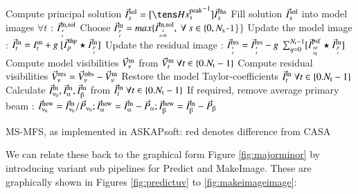 \documentclass[11pt,a4paper]{article}
\begin{document}
\begin{algorithm}
{{{{          Compute principal solution $\I^{\rm sol}_s = [{\He^{\rm peak}_s}^{-1}] \I^{\rm rhs}_s$\;
          Fill solution ${\vec{I}}^{\rm sol}_s$ into model images $\forall t$ : ${\vec{I}}^{\rm m,sol}_{{s}\atop{t}}$
       }
     }
     Choose ${\vec{I}}^{\rm m}_{{p}\atop{t}} = max\{{\vec{I}}^{\rm m,sol}_{{s}\atop{t=0}},~\forall~s\in\{0,N_{\rm s} $-$1\}\}$ \;
       {
        Update the model image : ${\vec{I}}^{\rm m}_t = I^{\rm m}_t + g ~[ {\vec{I}}^{\rm shp}_{p} \star {\vec{I}}^{\rm m}_{{p}\atop{t}}]$ \;
	{
          Update the residual image : ${\vec{I}}^{\rm res}_{{s}\atop{t}} = {\vec{I}}^{\rm res}_{{s}\atop{t}} - g ~\sum_{q=0}^{N_{\rm t} -1}[{\vec{I}}^{\rm psf}_{{sp}\atop{tq}} \star {\vec{I}}^{\rm m}_{{p}\atop{t}}]$\;
	}
       }
    }
   {\color{red} Compute model visibilities $\vec{V}^{\rm m}_{\nu}$ from  $\vec{V}^{\rm m}_t~\forall t\in \{0.N_{\rm t} -1\}$}\;
   Compute residual visibilities $\vec{V}^{\rm res}_{\nu} = \vec{V}^{\rm obs}_{\nu}-\vec{V}^{\rm m}_{\nu}$\;
  } 
Restore the model Taylor-coefficients ${\vec{I}}^{\rm m}_t~\forall t\in \{0.N_{\rm t} -1\}$ \;
Calculate $\vec{I}^{\rm m}_{\nuup_0}, \vec{I}^{\rm m}_{\alphaup}, \vec{I}^{\rm m}_{\betaup}$ from ${\vec{I}}^{\rm m}_t~\forall t\in \{0.N_{\rm t} -1\}$\;
If required, remove average primary beam : $\vec{I}^{\rm new}_{\nuup_0}=\vec{I}^{\rm m}_{\nuup_0}/\vec{P}_{\nuup_0};  \vec{I}^{\rm new}_{\alphaup}=\vec{I}^{\rm m}_{\alphaup}-\vec{P}_{\alphaup};  \vec{I}^{\rm new}_{\betaup}=\vec{I}^{\rm m}_{\betaup}-\vec{P}_{\betaup}$\;

  \caption[MS-MFS Algorithm]
         {MS-MFS, as implemented in ASKAPsoft: {\color{red} red denotes difference from CASA}}\label{ASKAP}

\end{algorithm}

We can relate these back to the graphical form Figure \ref{fig:majorminor} by introducing variant sub pipelines for Predict and MakeImage. These are graphically shown in Figures \ref{fig:predictuv} to \ref{fig:makeimageimage}: 
\end{document}

